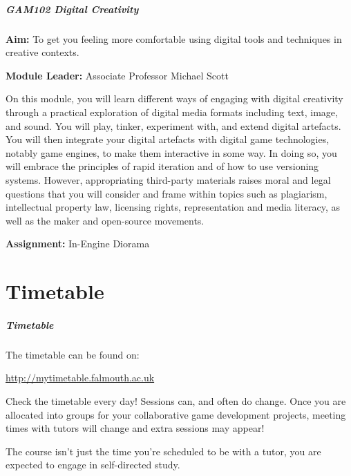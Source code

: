 \begin{frame}
	\frametitle{GAM102 Digital Creativity}
		
	\small{\textbf{Aim:} To get you feeling more comfortable using digital tools and techniques in creative contexts.}
	
	\vspace{0.5em}
	
	\small{\textbf{Module Leader:} Associate Professor Michael Scott}	
	
		\vspace{0.5em}
	
\footnotesize{On this module, you will learn different ways of engaging with digital creativity through a practical exploration of digital media formats including text, image, and sound. You will play, tinker, experiment with, and extend digital artefacts. You will then integrate your digital artefacts with digital game technologies, notably game engines, to make them interactive in some way. In doing so, you will embrace the principles of rapid iteration and of how to use versioning systems. However, appropriating third-party materials raises moral and legal questions that you will consider and frame within topics such as plagiarism, intellectual property law, licensing rights, representation and media literacy, as well as the maker and open-source movements. }
			\vspace{0.5em}
	
	\small{\textbf{Assignment:} In-Engine Diorama}		
\end{frame}

\part{Timetable}
\frame{\partpage}

\begin{frame}
	\frametitle{Timetable}
	
	The timetable can be found on:
	
	\vspace{0.5em}
	
	\indent \url{http://mytimetable.falmouth.ac.uk}
	
	\vspace{0.5em}
	
	Check the timetable every day! Sessions can, and often do change. Once you are allocated into groups for your collaborative game development projects, meeting times with tutors will change and extra sessions may appear!
	
	\vspace{0.5em}
	
	 The course isn't just the time you're scheduled to be with a tutor, you are expected to engage in self-directed study.
	
\end{frame}

